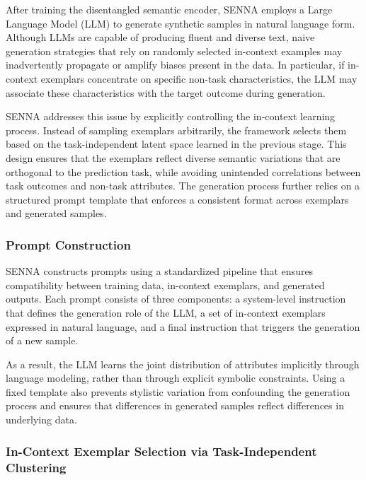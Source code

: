 \documentclass[runningheads]{llncs}
\begin{document}
After training the disentangled semantic encoder, SENNA employs a Large Language Model (LLM) to
generate synthetic samples in natural language form.
Although LLMs are capable of producing fluent and diverse text, naive generation strategies that
rely on randomly selected in-context examples may inadvertently propagate or amplify biases
present in the data.
In particular, if in-context exemplars concentrate on specific non-task characteristics,
the LLM may associate these characteristics with the target outcome during generation.

SENNA addresses this issue by explicitly controlling the in-context learning process.
Instead of sampling exemplars arbitrarily, the framework selects them based on the
task-independent latent space learned in the previous stage.
This design ensures that the exemplars reflect diverse semantic variations that are orthogonal
to the prediction task, while avoiding unintended correlations between task outcomes and
non-task attributes.
The generation process further relies on a structured prompt template that enforces a consistent
format across exemplars and generated samples.

\subsubsection{Prompt Construction}

SENNA constructs prompts using a standardized pipeline that ensures compatibility between training
data, in-context exemplars, and generated outputs.
Each prompt consists of three components: a system-level instruction that defines the generation
role of the LLM, a set of in-context exemplars expressed in natural language, and a final instruction
that triggers the generation of a new sample.

As a result, the LLM learns the joint distribution of attributes implicitly through language
modeling, rather than through explicit symbolic constraints.
Using a fixed template also prevents stylistic variation from confounding the generation process
and ensures that differences in generated samples reflect differences in underlying data.

\subsubsection{In-Context Exemplar Selection via Task-Independent Clustering}
\end{document}
